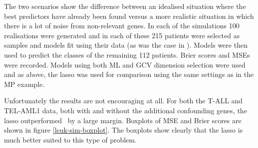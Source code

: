The two scenarios show the difference between an idealised situation where the best predictors have already been found versus a more realistic situation in which there is a lot of noise from non-relevant genes. In each of the simulations 100 realisations were generated and in each of these 215 patients were selected as samples and models fit using their data (as was the case in \cite{yeoh2002}). Models were then used to predict the classes of the remaining 112 patients. Brier scores and MSEs were recorded. Models using both ML and GCV dimension selection were used and as above, the lasso was used for comparison using the same settings as in the MP example. 

Unfortunately the results are not encouraging at all. For both the T-ALL and TEL-AML1 data, both with and without the additional confounding genes, the lasso outperformed \mdsds\ by a large margin. Boxplots of MSE and Brier scores are shown in figure \ref{leuk-sim-boxplot}. The boxplots show clearly that the lasso is much better suited to this type of problem.

